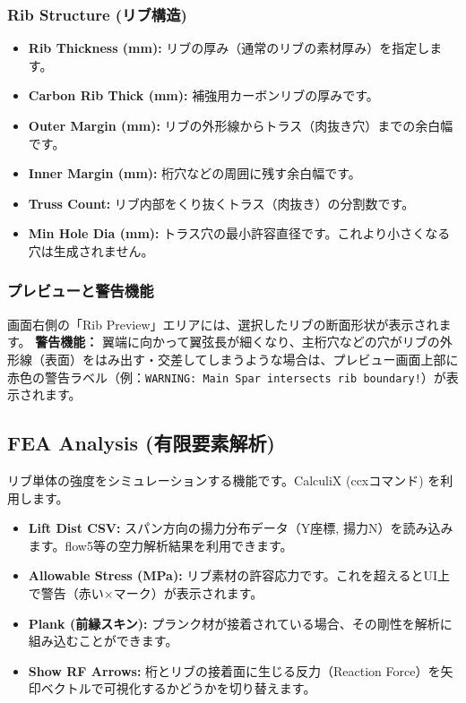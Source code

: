 \documentclass[11pt,a4paper]{ltjsarticle}
\begin{document}
\subsubsection{Rib Structure (リブ構造)}
\begin{itemize}
    \item \textbf{Rib Thickness (mm):} リブの厚み（通常のリブの素材厚み）を指定します。
    \item \textbf{Carbon Rib Thick (mm):} 補強用カーボンリブの厚みです。
    \item \textbf{Outer Margin (mm):} リブの外形線からトラス（肉抜き穴）までの余白幅です。
    \item \textbf{Inner Margin (mm):} 桁穴などの周囲に残す余白幅です。
    \item \textbf{Truss Count:} リブ内部をくり抜くトラス（肉抜き）の分割数です。
    \item \textbf{Min Hole Dia (mm):} トラス穴の最小許容直径です。これより小さくなる穴は生成されません。
\end{itemize}

\subsubsection{プレビューと警告機能}
画面右側の「Rib Preview」エリアには、選択したリブの断面形状が表示されます。
\textbf{警告機能：} 翼端に向かって翼弦長が細くなり、主桁穴などの穴がリブの外形線（表面）をはみ出す・交差してしまうような場合は、プレビュー画面上部に赤色の警告ラベル（例：\texttt{WARNING: Main Spar intersects rib boundary!}）が表示されます。

\subsection{FEA Analysis (有限要素解析)}
リブ単体の強度をシミュレーションする機能です。CalculiX (ccxコマンド) を利用します。
\begin{itemize}
    \item \textbf{Lift Dist CSV:} スパン方向の揚力分布データ（Y座標, 揚力N）を読み込みます。flow5等の空力解析結果を利用できます。
    \item \textbf{Allowable Stress (MPa):} リブ素材の許容応力です。これを超えるとUI上で警告（赤い×マーク）が表示されます。
    \item \textbf{Plank (前縁スキン):} プランク材が接着されている場合、その剛性を解析に組み込むことができます。
    \item \textbf{Show RF Arrows:} 桁とリブの接着面に生じる反力（Reaction Force）を矢印ベクトルで可視化するかどうかを切り替えます。
\end{itemize}
\end{document}
